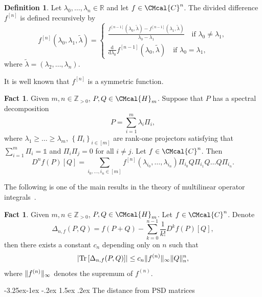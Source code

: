 \documentclass[10pt,a4paper]{article}
\makeatletter
\renewcommand{\subsubsection}{\@startsection{subsubsection}{2}{\z@}%
             {-3.25ex\@plus -1ex \@minus -.2ex}%
             {1.5ex \@plus .2ex}%
             {\normalfont\normalsize\scshape\bfseries}}
\def\C{\CMcal{C}}
\def\H{\CMcal{H}}
\theoremstyle{plain}
\theoremstyle{definition}
\newtheorem{definition}[theorem]{Definition}
\newtheorem{fact}[theorem]{Fact}
\newcommand{\reals}{{\mathbb R}}
\newcommand {\set} [1] {\ensuremath{ \left\lbrace #1 \right\rbrace }}
\newcommand {\br} [1] {\ensuremath{ \left( #1 \right) }}
\newcommand {\Br} [1] {\ensuremath{ \left[ #1 \right] }}
\DeclarePairedDelimiter{\norm}{\lVert}{\rVert}
\newcommand {\ab} [1] {\ensuremath{ \left| #1 \right| }}
\newcommand {\Tr} {\ensuremath{ \mathrm{Tr} }}
\newcommand {\id} {\ensuremath{\mathds{1}}}
\newcommand{\posint}{{\mathbb Z}_{>0}}
\renewcommand{\d}{\mathrm{d}}
\newcommand{\1}{\mathbb{1}} %
\makeatother
\begin{document}
\begin{definition}
Let $\lambda_0,\dots,\lambda_n\in\reals$ and let $f\in\C^n$. The divided difference $f^{[n]}$ is defined recursively by
\[f^{[n]}(\lambda_0,\lambda_1,\tilde{\lambda})=\begin{cases}
\frac{f^{[n-1]}(\lambda_0,\tilde{\lambda})-f^{[n-1]}(\lambda_1,\tilde{\lambda})}{\lambda_0-\lambda_1}\quad\text{if }\lambda_0\ne\lambda_1,\\
\frac{\d}{\d\lambda_0}f^{[n-1]}(\lambda_0,\tilde{\lambda})\quad\text{if }\lambda_0=\lambda_1,
\end{cases}\]
where $\tilde{\lambda}=(\lambda_2,\dots,\lambda_n)$.
\end{definition}

It is well known that $f^{[n]}$ is a symmetric function.


	
\begin{fact}
 \cite[Theorem 5.3.2]{skripka2019multilinear}
 \cite[Theorem 6.1]{SENDOV2007240}\label{fac:frechetD}
Given $m,n\in\posint$, $P,Q\in\H_m$. Suppose that $P$ has a spectral decomposition
\begin{equation}\label{eqn:specdecom}
P=\sum_{i=1}^{m}\lambda_i\Pi_i,
\end{equation}
where $\lambda_1\geq\dots\geq\lambda_{m}$, $\set{\Pi_i}_{i\in[{m}]}$ are rank-one projectors satisfying that $\sum_{i=1}^{m}\Pi_i=\id$ and $\Pi_i\Pi_j=0$ for all $i\ne j$. Let $f\in\C^{n}$. Then
\[D^nf(P)\Br{Q}=\sum_{i_0,\dots,i_n\in[m]}f^{[n]}\br{\lambda_{i_0},\dots,\lambda_{i_n}}\Pi_{i_0}Q\Pi_{i_1}Q\dots Q\Pi_{i_n}.\]
\end{fact}

The following is one of the main results in the theory of multilinear operator integrals~\cite{skripka2019multilinear}. 
\begin{fact}\label{fact:remainder} \cite[Theorem 5.3.12]{skripka2019multilinear}
Given $m,n\in\posint$, $P,Q\in\H_m$. Let $f\in\C^{n}$. Denote
\[\Delta_{n,f}(P,Q)=f(P+Q)-\sum_{k=0}^{n-1}\frac{1}{k!}D^kf(P)\Br{Q},\]
then there exists a constant $c_n$ depending only on $n$ such that 
\[\ab{\Tr\Br{\Delta_{n,f}(P,Q)}}\leq c_n\norm{f^{(n)}}_\infty\norm{Q}_n^n,\]
where $\norm{f^{(n)}}_\infty$ denotes the supremum of $f^{(n)}$.
\end{fact}

\subsubsection{The distance from PSD matrices}
\end{document}
